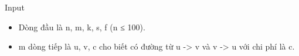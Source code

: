 Input
\begin{itemize}
	\item Dòng đầu là n, m, k, s, f (n ≤ 100).
	\item m dòng tiếp là u, v, c cho biết có đường từ u -> v và v -> u với chi phí là c.
\end{itemize}